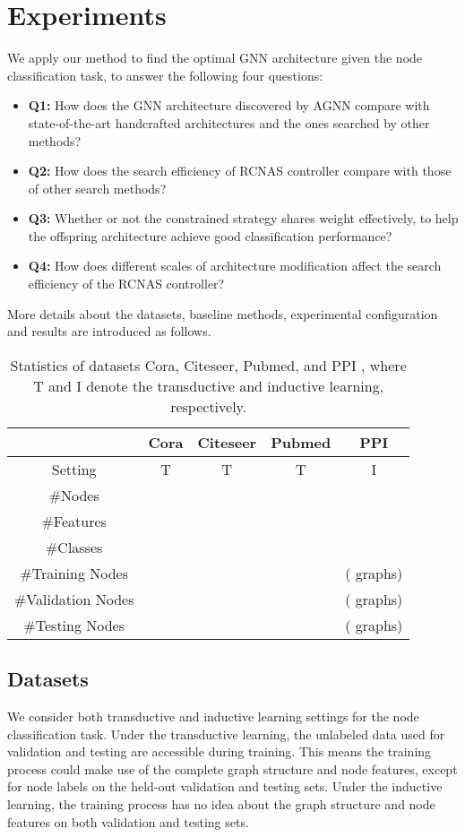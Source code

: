 \documentclass[sigconf]{acmart}
\begin{document}
\section{Experiments}
We apply our method to find the optimal GNN architecture given the node classification task, to answer the following four questions:
\begin{itemize}
    \item \textbf{Q1:} How does the GNN architecture discovered by AGNN compare with state-of-the-art handcrafted architectures and the ones searched by other methods?
    \item \textbf{Q2:} How does the search efficiency of RCNAS controller compare with those of other search methods?
    \item \textbf{Q3:} Whether or not the constrained strategy shares weight effectively, to help the offspring architecture achieve good classification performance?
    \item \textbf{Q4:} How does different scales of architecture modification affect the search efficiency of the RCNAS controller?
\end{itemize}
More details about the datasets, baseline methods, experimental configuration and results are introduced as follows.

\begin{table}[!htbp]
\setlength{\tabcolsep}{4pt}
  \caption{Statistics of  datasets Cora, Citeseer, Pubmed, and PPI \cite{velickovic2017graph, gao2018large}, where T and I denote the transductive and inductive learning, respectively.}
  \small
  \label{tab:dataset}
  \begin{tabular}{c|cccc}
    \toprule
     & Cora & Citeseer & Pubmed & PPI\\
    \midrule
    Setting & T & T & T & I \\
    \#Nodes &  &  &  &  \\
    \#Features &  &  &  &  \\
    \#Classes&  &  &  &  \\
    \#Training Nodes &  &  &  &  ( graphs) \\
    \#Validation Nodes &  &  &  &   ( graphs) \\
    \#Testing Nodes &  &  &  &  ( graphs) \\
  \bottomrule
\end{tabular}
\end{table}

\subsection{Datasets} We consider both transductive and inductive learning settings for the node classification task. Under the transductive learning, the unlabeled data used for validation and testing are accessible during training. This means the training process could make use of the complete graph structure and node features, except for node labels on the held-out validation and testing sets. Under the inductive learning, the training process has no idea about the graph structure and node features on both validation and testing sets.
\end{document}
